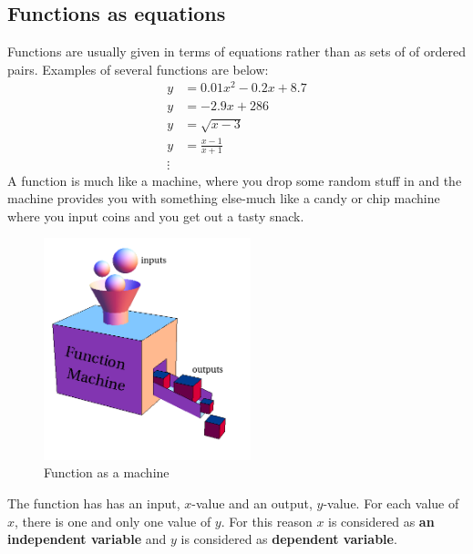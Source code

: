 \subsection{Functions as equations}
Functions are usually given in terms of equations rather than as sets of of ordered pairs. Examples of several functions are below:
\begin{align*}
    y&=0.01x^2-0.2x+8.7\\
    y&= -2.9x+286\\
    y&=\sqrt{x-3}\\
    y&=\frac{x-1}{x+1} \\
    \vdots&
\end{align*}
A function is much like a machine, where you drop some random stuff in and the machine provides you with something else-much like a candy or chip machine where you input coins and you get out a tasty snack.
\begin{figure}[ht]
    \centering
    \includegraphics[width=6cm]{Pics/func_machine.png}
    \caption{Function as a machine}
    \label{fig:func_mach}
\end{figure}
\newpage
The function has has an input, $x$-value and an output, $y$-value. For each value of $x$, there is one and only one value of $y$. For this reason $x$ is considered as \textbf{an independent variable} and $y$ is considered as \textbf{dependent variable}.\\

